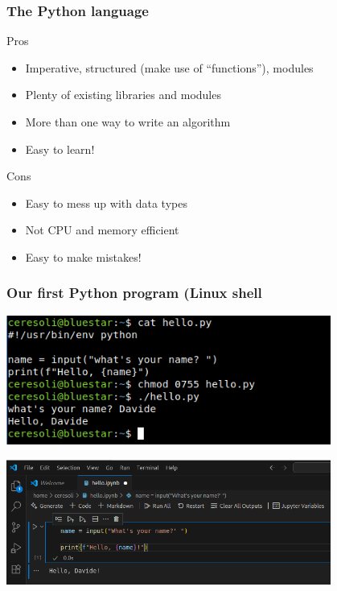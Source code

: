 \documentclass{beamer}
\begin{document}
\begin{frame}[fragile]
  \frametitle{The Python language}
  \begin{block}{Pros}
    \begin{itemize}
    \item Imperative, structured (make use of ``functions''), modules
    \item Plenty of existing libraries and modules
    \item More than one way to write an algorithm
    \item {\color{green} Easy to learn!}
    \end{itemize}
  \end{block}\pause
  \begin{block}{Cons}
    \begin{itemize}
    \item Easy to mess up with data types
    \item Not CPU and memory efficient
    \item {\color{red} Easy to make mistakes!}
    \end{itemize}
  \end{block}
\end{frame}

\begin{frame}[fragile]
  \frametitle{Our first Python program (Linux shell}
  \begin{center}
  \includegraphics[width=0.8\textwidth]{hello_cli.png}
  \end{center}
  \begin{center}
  \includegraphics[width=0.8\textwidth]{hello_vscode.png}
  \end{center}
\end{frame}
\end{document}
